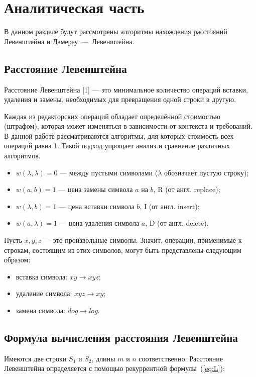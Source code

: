 \documentclass[a4paper, 12pt]{extreport}
\begin{document}
\chapter{Аналитическая часть}
В данном разделе будут рассмотрены алгоритмы нахождения расстояний Левенштейна и Дамерау~---~Левенштейна.
\section{Расстояние Левенштейна}

Расстояние Левенштейна [1] --- это минимальное количество операций вставки, удаления и замены, необходимых для превращения одной строки в другую.

Каждая из редакторских операций обладает определённой стоимостью (штрафом), которая может изменяться в зависимости от контекста и требований. В данной работе рассматриваются алгоритмы, для которых стоимость всех операций равна 1. Такой подход упрощает анализ и сравнение различных алгоритмов. 
\begin{itemize}
        \item[--] $w(\lambda, \lambda) = 0$ --- между пустыми символами ($\lambda$ обозначает пустую строку);
	\item[--] $w(a, b) = 1$ --- цена замены символа $a$ на $b$, R (от англ. replace);
	\item[--] $w(\lambda, b) = 1$ --- цена вставки символа $b$, I (от англ. insert);
	\item[--] $w(a, \lambda) = 1$ --- цена удаления символа $a$, D (от англ. delete).
\end{itemize}

Пусть $x, y, z$ — это произвольные символы. Значит, операции, применимые к строкам, состоящим из этих символов, могут быть представлены следующим образом:
\begin{itemize}
    \item[--] вставка символа: $xy \rightarrow xyz$;
    \item[--] удаление символа: $xyz \rightarrow xy$;
    \item[--] замена символа: $dog \rightarrow log$.
\end{itemize}

\section{Формула вычисления расстояния Левенштейна}
Имеются две строки $S_{1}$ и $S_{2}$, длины $m$ и $n$ соответственно. Расстояние Левенштейна определяется с помощью рекуррентной формулы~(\ref{eq:L}):
\end{document}
